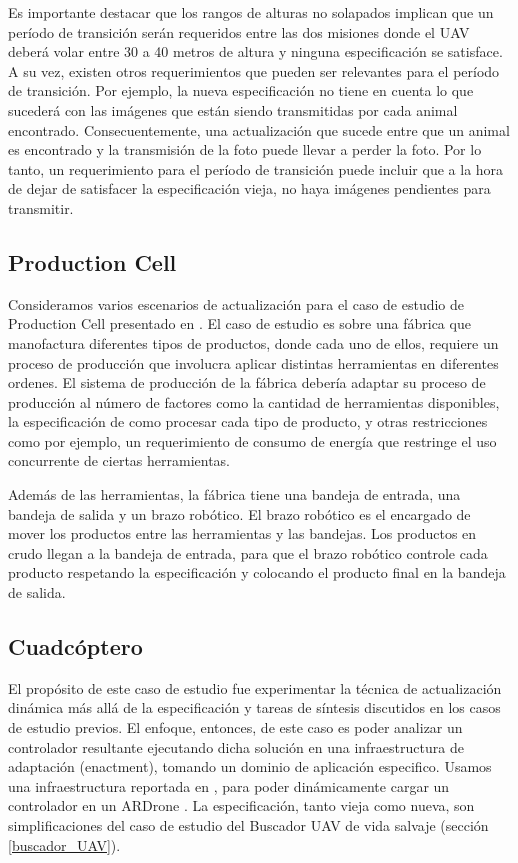 Es importante destacar que los rangos de alturas no solapados implican que un período de transición serán requeridos
entre las dos misiones donde el UAV deberá volar entre 30 a 40 metros de altura y ninguna especificación se satisface.
A su vez, existen otros requerimientos que pueden ser relevantes para el período de transición. Por ejemplo, la nueva
especificación no tiene en cuenta lo que sucederá con las imágenes que están siendo transmitidas por cada animal
encontrado. Consecuentemente, una actualización que sucede entre que un animal es encontrado y la transmisión de la foto
puede llevar a perder la foto. Por lo tanto, un requerimiento para el período de transición puede incluir que a la hora
de dejar de satisfacer la especificación vieja, no haya imágenes pendientes para transmitir.


\subsection{Production Cell}

Consideramos varios escenarios de actualización para el caso de estudio de Production Cell presentado en
\cite{Lewerentz:1995:646391}. El caso de estudio es sobre una fábrica que manofactura diferentes tipos de productos,
donde cada uno de ellos, requiere un proceso de producción que involucra aplicar distintas herramientas en
diferentes ordenes. El sistema de producción de la fábrica debería adaptar su proceso de producción al número de
factores como la cantidad de herramientas disponibles, la especificación de como procesar cada tipo de producto, y otras
restricciones como por ejemplo, un requerimiento de consumo de energía que restringe el uso concurrente de ciertas
herramientas.

Además de las herramientas, la fábrica tiene una bandeja de entrada, una bandeja de salida y un brazo robótico. El brazo
robótico es el encargado de mover los productos entre las herramientas y las bandejas. Los productos en crudo llegan a
la bandeja de entrada, para que el brazo robótico controle cada producto respetando la especificación y colocando el
producto final en la bandeja de salida.

\subsection{Cuadcóptero}

El propósito de este caso de estudio fue experimentar la técnica de actualización dinámica más allá de la especificación
y tareas de síntesis discutidos en los casos de estudio previos. El enfoque, entonces, de este caso es poder analizar un
controlador resultante ejecutando dicha solución en una infraestructura de adaptación (enactment), tomando un dominio de
aplicación especifico. Usamos una infraestructura reportada en \cite{Braberman:2013:CSM:2486788.2487002}, para poder
dinámicamente cargar un controlador en un ARDrone \cite{ARDrone}. La especificación, tanto vieja como nueva, son
simplificaciones del caso de estudio del Buscador UAV de vida salvaje (sección \ref{buscador_UAV}). 

